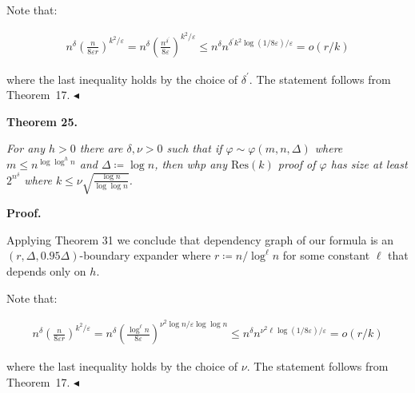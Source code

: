 Note that:\par


\[\begin{gathered}
n^{\delta}\left(\frac{n}{8\varepsilon r}\right)^{k^{2}/\varepsilon}=n^{\delta}%
\left(\frac{n^{\delta^{\prime}}}{8\varepsilon}\right)^{k^{2}/\varepsilon}\leq n%
^{\delta}n^{\delta^{\prime}k^{2}\log(1/8\varepsilon)/\varepsilon}=o(r/k)
\end{gathered}\]


where the last inequality holds by the choice of $\delta^{\prime}$. The statement follows from Theorem 17.
$\blacktriangleleft$\par





\par\medskip\noindent\textbf{
\textbf{Theorem 25}\textbf{.}
}\par



\emph{For any $h>0$ there are $\delta,\nu>0$ such that if $\varphi\sim\varphi(m,n,\Delta)$ where
$m\leq n^{\log\log^{h}n}$ and $\Delta\coloneqq\log n$, then whp any $\mathrm{Res}(k)$ proof of $\varphi$ has
size at least $2^{n^{\delta}}$ where $k\leq\nu\sqrt{\frac{\log{n}}{\log\log n}}$.}\par







\par\medskip\noindent\textbf{Proof.}\par




Applying Theorem 31 we conclude that dependency graph of our formula is an
$(r,\Delta,0.95\Delta)$-boundary expander where $r\coloneqq n/\log^{\ell}n$ for some constant
$\ell$ that depends only on $h$.\par




Note that:\par


\[\begin{gathered}
n^{\delta}\left(\frac{n}{8\varepsilon r}\right)^{k^{2}/\varepsilon}=n^{\delta}%
\left(\frac{\log^{\ell}n}{8\varepsilon}\right)^{\nu^{2}\log n/\varepsilon\log%
\log n}\leq n^{\delta}n^{\nu^{2}\ell\log(1/8\varepsilon)/\varepsilon}=o(r/k)
\end{gathered}\]


where the last inequality holds by the choice of $\nu$. The statement follows from Theorem 17.
$\blacktriangleleft$\par






